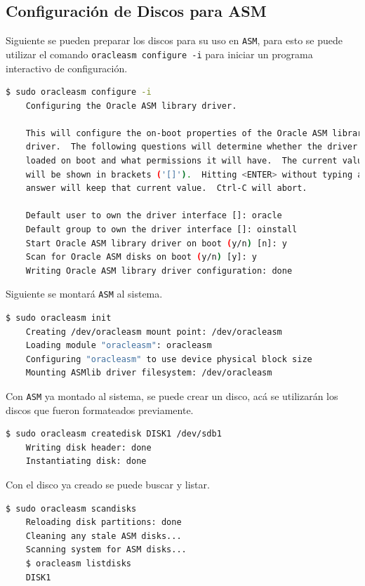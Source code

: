 \documentclass{article}
\begin{document}
\subsection{Configuración de Discos para ASM}

Siguiente se pueden preparar los discos para su uso en \texttt{ASM}, para esto se puede utilizar el comando \texttt{oracleasm configure -i} para iniciar un programa interactivo de configuración.

\begin{lstlisting}[style=mystyle,language=bash]
	$ sudo oracleasm configure -i
	Configuring the Oracle ASM library driver.

	This will configure the on-boot properties of the Oracle ASM library
	driver.  The following questions will determine whether the driver is
	loaded on boot and what permissions it will have.  The current values
	will be shown in brackets ('[]').  Hitting <ENTER> without typing an
	answer will keep that current value.  Ctrl-C will abort.

	Default user to own the driver interface []: oracle
	Default group to own the driver interface []: oinstall
	Start Oracle ASM library driver on boot (y/n) [n]: y
	Scan for Oracle ASM disks on boot (y/n) [y]: y
	Writing Oracle ASM library driver configuration: done
\end{lstlisting}

Siguiente se montará \texttt{ASM} al sistema.

\begin{lstlisting}[style=mystyle,language=bash]
	$ sudo oracleasm init
	Creating /dev/oracleasm mount point: /dev/oracleasm
	Loading module "oracleasm": oracleasm
	Configuring "oracleasm" to use device physical block size
	Mounting ASMlib driver filesystem: /dev/oracleasm
\end{lstlisting}

Con \texttt{ASM} ya montado al sistema, se puede crear un disco, acá se utilizarán los discos que fueron formateados previamente.

\begin{lstlisting}[style=mystyle,language=bash]
	$ sudo oracleasm createdisk DISK1 /dev/sdb1
	Writing disk header: done
	Instantiating disk: done
\end{lstlisting}

Con el disco ya creado se puede buscar y listar.

\begin{lstlisting}[style=mystyle,language=bash]
	$ sudo oracleasm scandisks
	Reloading disk partitions: done
	Cleaning any stale ASM disks...
	Scanning system for ASM disks...
	$ oracleasm listdisks
	DISK1
\end{lstlisting}
\end{document}
